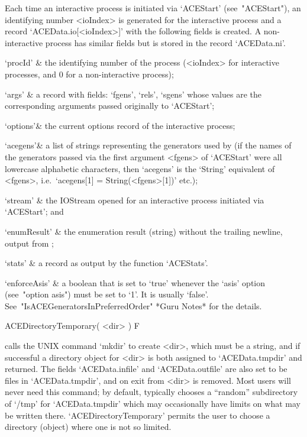 Each time an interactive {\ACE} process is  initiated  via  `ACEStart'
(see~"ACEStart"), an identifying number <ioIndex> is generated for the
interactive process and  a  record  `ACEData.io[<ioIndex>]'  with  the
following fields is created. A  non-interactive  process  has  similar
fields but is stored in the record `ACEData.ni'.

\beginitems

\quad`procId' & the identifying number of the process  (<ioIndex>  for
interactive processes, and 0 for a non-interactive process);

\quad`args'   & a record with fields: `fgens', `rels',  `sgens'  whose
values  are  the  corresponding   arguments   passed   originally   to
`ACEStart';

\quad`options'& the current options record of the interactive process;

\quad`acegens'& a list of strings representing the generators used  by
{\ACE} (if the names of the generators passed via the  first  argument
<fgens> of `ACEStart' were all lowercase alphabetic  characters,  then
`acegens' is the `String' equivalent of <fgens>,  i.e.~`acegens[1]   =
String(<fgens>[1])' etc.);

\quad`stream' & the IOStream opened for an interactive {\ACE}  process
initiated via `ACEStart'; and

\quad`enumResult' & 
the enumeration result (string) without the trailing  newline,  output
from {\ACE};

\quad`stats'  & a record as output by the function `ACEStats'.

\quad`enforceAsis' & 
a  boolean  that  is  set  to  `true'  whenever  the   `asis'   option
(see~"option asis") must  be  set  to  `1'.  It  is  usually  `false'.
See~"IsACEGeneratorsInPreferredOrder" *Guru Notes* for the details.

\enditems

\>ACEDirectoryTemporary( <dir> ) F

calls the UNIX command `mkdir'  to  create  <dir>,  which  must  be  a
string, and if  successful  a  directory  object  for  <dir>  is  both
assigned to `ACEData.tmpdir' and returned. The fields `ACEData.infile'
and `ACEData.outfile' are also set to be  files  in  `ACEData.tmpdir',
and on exit from {\GAP} <dir> is removed. Most users will  never  need
this command;  by  default,  {\GAP}  typically  chooses  a  ``random''
subdirectory of `/tmp' for  `ACEData.tmpdir'  which  may  occasionally
have limits on what  may  be  written  there.  `ACEDirectoryTemporary'
permits the user to choose a directory (object) where one  is  not  so
limited.


